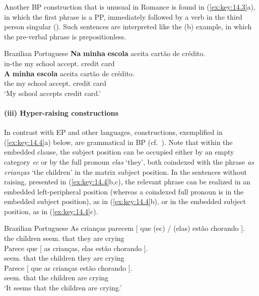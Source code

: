 \documentclass[output=paper]{langsci/langscibook}
\begin{document}
Another \gls{BP} construction that is unusual in
Romance is found in (\ref{ex:key:14.3}a), in which the first phrase is a PP,
immediately followed by a verb in the third person singular
(\citealt{AvelarCyrino2008}). Such sentences are interpreted like the (b)
example, in which the pre-verbal phrase is prepositionless.

\ea%
    \label{ex:key:14.3}Brazilian Portuguese
	\ea
    \gll   \textbf{Na} \textbf{minha} \textbf{escola} aceita {cartão de crédito}.\\
            in-the my school accept.\Tsg{} {credit card}\\
    \ex
    \gll \textbf{A} \textbf{minha} \textbf{escola} aceita {cartão de crédito}.\\
            the my school accept.\Tsg{} {credit card}\\
    \glt    ‘My school accepts credit card.’
    \z
\z

\paragraph*{(iii) Hyper-raising constructions}

In contrast with \gls{EP} and other  languages, 
constructions, exemplified in (\ref{ex:key:14.4}a) below, are grammatical in
\gls{BP} (cf.\ \citealt{NunesMartins2010}). Note that within the embedded
clause, the subject position can be occupied either by an empty category
\emph{ec} or by the full pronoun \emph{elas} ‘they’, both coindexed with the
phrase \emph{as crianças} ‘the children’ in the matrix subject position.
In the sentences without raising, presented in (\ref{ex:key:14.4}b,c), the
relevant phrase can be realized in an embedded left-peripheral position
(whereas a coindexed full pronoun is in the embedded subject position), as in
(\ref{ex:key:14.4}b), or in the embedded subject position, as in
(\ref{ex:key:14.4}c).\newpage

\ea%
    \label{ex:key:14.4}Brazilian Portuguese
	\ea
	\gll    As crianças parecem [ que (ec) / (elas) estão chorando ].\\
            the children seem.\Tpl{} {} that {} {} \hphantom{(}they are crying\\
    \ex
    \gll Parece que [ as crianças, elas estão chorando ].\\
      seem.\Tsg{} that {} the children they are crying\\
    \ex
    \gll    Parece [ que as crianças estão chorando ].\\
            seem.\Tsg{} {} that the children are crying\\
    \glt    ‘It seems that the children are crying.’
    \z
\z
\end{document}

